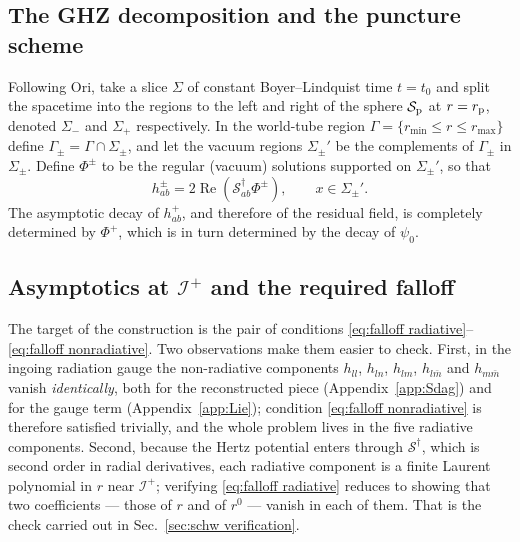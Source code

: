 \documentclass[preprint,aps,nofootinbib,a4paper,superscriptaddress,longbibliography,amsfonts, amssymb,amsmath,titlepage]{revtex4-1}
\numberwithin{equation}{section} %
\renewcommand{\S}{{\mathcal S}}
\renewcommand{\Re}{\operatorname{Re}}
\def\p{{\rm p}}
\def\rp{r_{\p}}
\def\rmx{r_{\mathrm{max}}}
\def\rmn{r_{\mathrm{min}}}
\def\scri{\mathscr{I}^{+}}
\begin{document}
\subsection{The GHZ decomposition and the puncture scheme}
\label{sec:ghz}
Following Ori, take a slice $\Sigma$ of constant Boyer--Lindquist time
$t=t_{0}$ and split the spacetime into the regions to the left and right of
the sphere $\mathcal S_{\p}$ at $r=\rp$, denoted $\Sigma_{-}$ and
$\Sigma_{+}$ respectively.  In the world-tube region
$\Gamma = \{\rmn\leq r \leq \rmx\}$ define $\Gamma_{\pm} = \Gamma \cap
\Sigma_{\pm}$, and let the vacuum regions $\Sigma_{\pm}'$ be the complements
of $\Gamma_{\pm}$ in $\Sigma_{\pm}$.  Define $\Phi^{\pm}$ to be the regular
(vacuum) solutions supported on $\Sigma_{\pm}'$, so that
\begin{equation}
h^{\pm}_{ab} = 2 \Re ( \S_{ab}^{\dagger} \Phi^{\pm}), \qquad x \in \Sigma_{\pm}' .
\end{equation}
The asymptotic decay of $h^{+}_{ab}$, and therefore of the residual field, is
completely determined by $\Phi^{+}$, which is in turn determined by the decay
of $\psi_{0}$.

\subsection{Asymptotics at $\scri$ and the required falloff}
\label{sec:asymptotics}
The target of the construction is the pair of conditions
\eqref{eq:falloff radiative}--\eqref{eq:falloff nonradiative}.  Two
observations make them easier to check.  First, in the ingoing radiation
gauge the non-radiative components $h_{ll}$, $h_{ln}$, $h_{lm}$,
$h_{l\bar m}$ and $h_{m\bar m}$ vanish \emph{identically}, both for the
reconstructed piece (Appendix~\ref{app:Sdag}) and for the gauge term
(Appendix~\ref{app:Lie}); condition \eqref{eq:falloff nonradiative} is
therefore satisfied trivially, and the whole problem lives in the five
radiative components.  Second, because the Hertz potential enters through
$\S^{\dagger}$, which is second order in radial derivatives, each radiative
component is a finite Laurent polynomial in $r$ near $\scri$; verifying
\eqref{eq:falloff radiative} reduces to showing that two coefficients ---
those of $r$ and of $r^{0}$ --- vanish in each of them.  That is the check
carried out in Sec.~\ref{sec:schw verification}.
\end{document}
